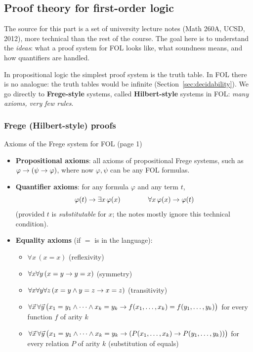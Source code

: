 \subsection{Proof theory for first-order logic}
\label{sec:proof-theory-fol}

The source for this part is a set of university lecture notes (Math 260A, UCSD, 2012),
more technical than the rest of the course. The goal here is to understand the
\emph{ideas}: what a proof system for FOL looks like, what soundness means, and how
quantifiers are handled.

In propositional logic the simplest proof system is the truth table. In FOL there is no
analogue: the truth tables would be infinite (Section~\ref{sec:decidability}). We go
directly to \textbf{Frege-style} systems, called \textbf{Hilbert-style} systems in FOL:
\emph{many axioms, very few rules}.

\subsubsection{Frege (Hilbert-style) proofs}

\begin{nbdef}{Axioms of the Frege system for FOL (page 1)}
\begin{itemize}
  \item \textbf{Propositional axioms}: all axioms of propositional Frege systems, such as
        $\varphi \rightarrow (\psi \rightarrow \varphi)$, where now $\varphi, \psi$ can be any FOL
        formulas.
  \item \textbf{Quantifier axioms}: for any formula $\varphi$ and any term $t$,
        \[ \varphi(t) \rightarrow \exists x\,\varphi(x) \qquad\qquad \forall x\,\varphi(x) \rightarrow \varphi(t) \]
        (provided $t$ is \emph{substitutable} for $x$; the notes mostly ignore this
        technical condition).
  \item \textbf{Equality axioms} (if $=$ is in the language):
        \begin{itemize}[nosep]
          \item $\forall x\,(x = x)$ \hfill(reflexivity)
          \item $\forall x \forall y\,(x = y \rightarrow y = x)$ \hfill(symmetry)
          \item $\forall x \forall y \forall z\,(x = y \land y = z \rightarrow x = z)$ \hfill(transitivity)
          \item $\forall \vec x\, \forall \vec y\,\big(x_1 = y_1 \land \cdots \land x_k = y_k
                \rightarrow f(x_1, \ldots, x_k) = f(y_1, \ldots, y_k)\big)$ for every function $f$
                of arity $k$
          \item $\forall \vec x\, \forall \vec y\,\big(x_1 = y_1 \land \cdots \land x_k = y_k
                \rightarrow (P(x_1, \ldots, x_k) \rightarrow P(y_1, \ldots, y_k))\big)$ for every
                relation $P$ of arity $k$ \hfill(substitution of equals)
        \end{itemize}
\end{itemize}
\end{nbdef}

